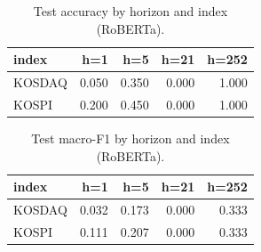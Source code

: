 \begin{table}[t]\centering
\caption{Test accuracy by horizon and index (RoBERTa).}
\begin{tabular}{lrrrr}
\toprule
index & h=1 & h=5 & h=21 & h=252 \\
\midrule
KOSDAQ & 0.050 & 0.350 & 0.000 & 1.000 \\
KOSPI & 0.200 & 0.450 & 0.000 & 1.000 \\
\bottomrule
\end{tabular}
\end{table}

\begin{table}[t]\centering
\caption{Test macro-F1 by horizon and index (RoBERTa).}
\begin{tabular}{lrrrr}
\toprule
index & h=1 & h=5 & h=21 & h=252 \\
\midrule
KOSDAQ & 0.032 & 0.173 & 0.000 & 0.333 \\
KOSPI & 0.111 & 0.207 & 0.000 & 0.333 \\
\bottomrule
\end{tabular}
\end{table}